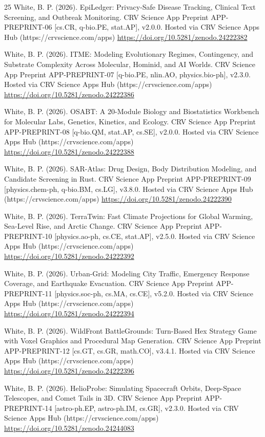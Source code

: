 \documentclass[10pt,letterpaper]{article}
\begin{document}
\begin{thebibliography}{25}
 White, B. P. (2026). EpiLedger: Privacy-Safe Disease Tracking, Clinical Text Screening, and Outbreak Monitoring. CRV Science App Preprint APP-PREPRINT-06 [cs.CR, q-bio.PE, stat.AP], v2.0.0. Hosted via CRV Science Apps Hub (https://crvscience.com/apps) \url{https://doi.org/10.5281/zenodo.24222382}

 White, B. P. (2026). ITME: Modeling Evolutionary Regimes, Contingency, and Substrate Complexity Across Molecular, Hominid, and AI Worlds. CRV Science App Preprint APP-PREPRINT-07 [q-bio.PE, nlin.AO, physics.bio-ph], v2.3.0. Hosted via CRV Science Apps Hub (https://crvscience.com/apps) \url{https://doi.org/10.5281/zenodo.24222386}

 White, B. P. (2026). OSABT: A 20-Module Biology and Biostatistics Workbench for Molecular Labs, Genetics, Kinetics, and Ecology. CRV Science App Preprint APP-PREPRINT-08 [q-bio.QM, stat.AP, cs.SE], v2.0.0. Hosted via CRV Science Apps Hub (https://crvscience.com/apps) \url{https://doi.org/10.5281/zenodo.24222388}

 White, B. P. (2026). SAR-Atlas: Drug Design, Body Distribution Modeling, and Candidate Screening in Rust. CRV Science App Preprint APP-PREPRINT-09 [physics.chem-ph, q-bio.BM, cs.LG], v3.8.0. Hosted via CRV Science Apps Hub (https://crvscience.com/apps) \url{https://doi.org/10.5281/zenodo.24222390}

 White, B. P. (2026). TerraTwin: Fast Climate Projections for Global Warming, Sea-Level Rise, and Arctic Change. CRV Science App Preprint APP-PREPRINT-10 [physics.ao-ph, cs.CE, stat.AP], v2.5.0. Hosted via CRV Science Apps Hub (https://crvscience.com/apps) \url{https://doi.org/10.5281/zenodo.24222392}

 White, B. P. (2026). Urban-Grid: Modeling City Traffic, Emergency Response Coverage, and Earthquake Evacuation. CRV Science App Preprint APP-PREPRINT-11 [physics.soc-ph, cs.MA, cs.CE], v5.2.0. Hosted via CRV Science Apps Hub (https://crvscience.com/apps) \url{https://doi.org/10.5281/zenodo.24222394}

 White, B. P. (2026). WildFront BattleGrounds: Turn-Based Hex Strategy Game with Voxel Graphics and Procedural Map Generation. CRV Science App Preprint APP-PREPRINT-12 [cs.GT, cs.GR, math.CO], v3.4.1. Hosted via CRV Science Apps Hub (https://crvscience.com/apps) \url{https://doi.org/10.5281/zenodo.24222396}

 White, B. P. (2026). HelioProbe: Simulating Spacecraft Orbits, Deep-Space Telescopes, and Comet Tails in 3D. CRV Science App Preprint APP-PREPRINT-14 [astro-ph.EP, astro-ph.IM, cs.GR], v2.3.0. Hosted via CRV Science Apps Hub (https://crvscience.com/apps) \url{https://doi.org/10.5281/zenodo.24244083}


\end{thebibliography}
\end{document}
